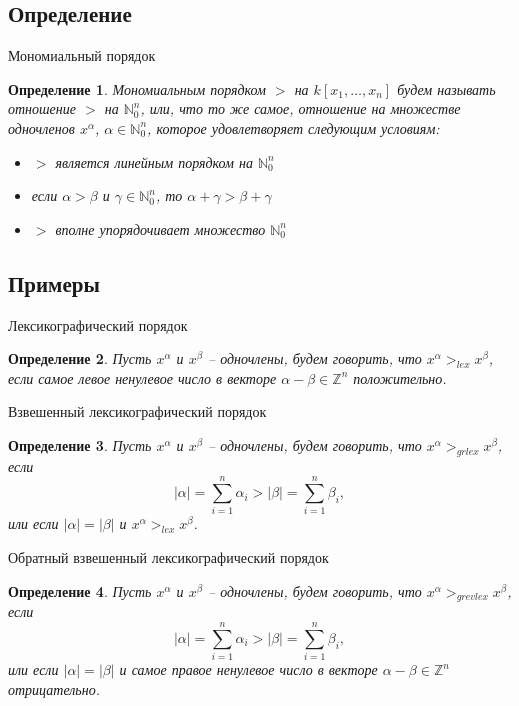 \documentclass[notheorems,aspectratio=169]{beamer}
\newtheorem{definition}{Определение}
\begin{document}
\subsection{Определение}
\begin{frame}{Мономиальный порядок}
    \begin{definition}
    Мономиальным порядком $>$ на $k[x_1, \dots, x_n]$ будем называть отношение $>$ на $ \mathbb{N}_{0}^n$, или, что то же самое, отношение на множестве одночленов $x^\alpha$, $\alpha\in \mathbb{N}_{0}^n$, которое удовлетворяет следующим условиям:
    \begin{itemize}
        \item [(i)] $>$ является линейным порядком на $\mathbb{N}_{0}^n$
        \item [(ii)] если $\alpha > \beta$ и $\gamma \in \mathbb{N}_{0}^n$, то $\alpha + \gamma > \beta + \gamma $
        \item [(iii)] $>$ вполне упорядочивает множество $\mathbb{N}_{0}^n$
    \end{itemize}
    \end{definition}

\end{frame}

\subsection{Примеры}
\begin{frame}{Лексикографический порядок}
    \begin{definition}
         Пусть $x^\alpha$ и $x^\beta$ -- одночлены, будем говорить, что $x^\alpha >_{lex} x^\beta$, если самое левое ненулевое число в векторе $\alpha - \beta \in \mathbb{Z}^n$ положительно.
    \end{definition}
\end{frame}

\begin{frame}{Взвешенный лексикографический порядок}
    \begin{definition}
         Пусть $x^\alpha$ и $x^\beta$ -- одночлены, будем говорить, что $x^\alpha >_{grlex} x^\beta$, если 
        $$
        |\alpha| = \sum_{i = 1}^n \alpha_i > |\beta| = \sum_{i = 1}^n \beta_i,
        $$
        или если $|\alpha| = |\beta|$ и  $x^\alpha >_{lex} x^\beta$.
    \end{definition}
   
\end{frame}

\begin{frame} {Обратный взвешенный лексикографический порядок}
    \begin{definition}
    Пусть $x^\alpha$ и $x^\beta$ -- одночлены, будем говорить, что $x^\alpha >_{grevlex} x^\beta$, если 
    $$
    |\alpha| = \sum_{i = 1}^n \alpha_i > |\beta| = \sum_{i = 1}^n \beta_i,
    $$
    или если $|\alpha| = |\beta|$ и самое правое ненулевое число в векторе $\alpha - \beta \in \mathbb{Z}^n$ отрицательно.
    \end{definition}
\end{frame}
\end{document}
